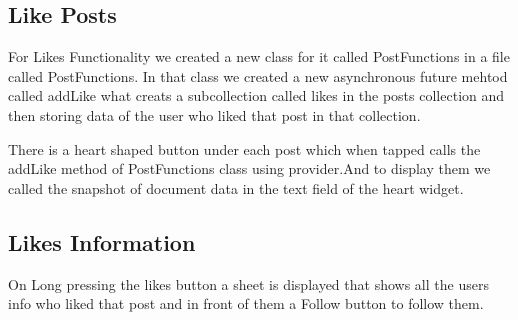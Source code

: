 \subsection{Like Posts}
For Likes Functionality we created a new class for it called PostFunctions in a file called PostFunctions. In that class we created a new asynchronous future mehtod called addLike what creats a subcollection called likes in the posts collection and then storing data of the user who liked that post in that collection.

There is a heart shaped button under each post which when tapped calls the addLike method of PostFunctions class using provider.And to display them we called the snapshot of document data in the text field of the heart widget.

\subsection{Likes Information}
On Long pressing the likes button a sheet is displayed that shows all the users info who liked that post and in front of them a Follow button to follow them.

